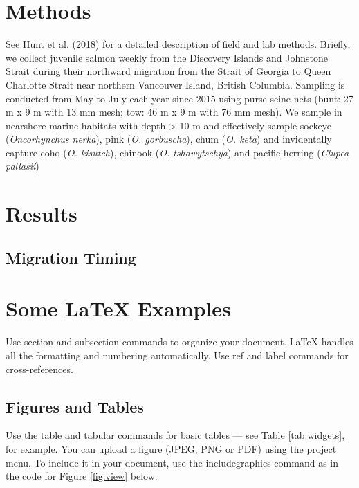 \documentclass[fleqn,10pt,lineno]{wlpeerj} %
\theoremstyle{definition}
\theoremstyle{definition}
\theoremstyle{definition}
\theoremstyle{remark}
\begin{document}
\section*{Methods}\label{methods}

See Hunt et al. (2018) for a detailed description of field and lab
methods. Briefly, we collect juvenile salmon weekly from the Discovery
Islands and Johnstone Strait during their northward migration from the
Strait of Georgia to Queen Charlotte Strait near northern Vancouver
Island, British Columbia. Sampling is conducted from May to July each
year since 2015 using purse seine nets (bunt: 27 m x 9 m with 13 mm
mesh; tow: 46 m x 9 m with 76 mm mesh). We sample in nearshore marine
habitats with depth \textgreater{} 10 m and effectively sample sockeye
(\emph{Oncorhynchus nerka}), pink (\emph{O. gorbuscha}), chum (\emph{O.
keta}) and invidentally capture coho (\emph{O. kisutch}), chinook
(\emph{O. tshawytschya}) and pacific herring (\emph{Clupea pallasii})

\section*{Results}\label{results}

\subsection{Migration Timing}\label{migration-timing}

\section*{\texorpdfstring{Some \LaTeX{}
Examples}{Some  Examples}}\label{some-examples}

Use section and subsection commands to organize your document. \LaTeX{}
handles all the formatting and numbering automatically. Use ref and
label commands for cross-references.

\subsection*{Figures and Tables}\label{figures-and-tables}

Use the table and tabular commands for basic tables --- see Table
\ref{tab:widgets}, for example. You can upload a figure (JPEG, PNG or
PDF) using the project menu. To include it in your document, use the
includegraphics command as in the code for Figure \ref{fig:view} below.
\end{document}
